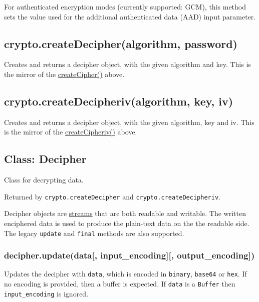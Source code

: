 For authenticated encryption modes (currently supported: GCM), this
method sets the value used for the additional authenticated data (AAD)
input parameter.

\subsection{crypto.createDecipher(algorithm,
password)}\label{crypto.createdecipheralgorithm-password}

Creates and returns a decipher object, with the given algorithm and key.
This is the mirror of the
\hyperref[cryptoux5fcryptoux5fcreatecipherux5falgorithmux5fpassword]{createCipher()}
above.

\subsection{crypto.createDecipheriv(algorithm, key,
iv)}\label{crypto.createdecipherivalgorithm-key-iv}

Creates and returns a decipher object, with the given algorithm, key and
iv. This is the mirror of the
\hyperref[cryptoux5fcryptoux5fcreatecipherivux5falgorithmux5fkeyux5fiv]{createCipheriv()}
above.

\subsection{Class: Decipher}\label{class-decipher}

Class for decrypting data.

Returned by \texttt{crypto.createDecipher} and
\texttt{crypto.createDecipheriv}.

Decipher objects are \href{stream.html}{streams} that are both readable
and writable. The written enciphered data is used to produce the
plain-text data on the the readable side. The legacy \texttt{update} and
\texttt{final} methods are also supported.

\subsubsection{decipher.update(data{[}, input\_encoding{]}{[},
output\_encoding{]})}\label{decipher.updatedata-inputux5fencoding-outputux5fencoding}

Updates the decipher with \texttt{data}, which is encoded in
\texttt{\textquotesingle{}binary\textquotesingle{}},
\texttt{\textquotesingle{}base64\textquotesingle{}} or
\texttt{\textquotesingle{}hex\textquotesingle{}}. If no encoding is
provided, then a buffer is expected. If \texttt{data} is a
\texttt{Buffer} then \texttt{input\_encoding} is ignored.

